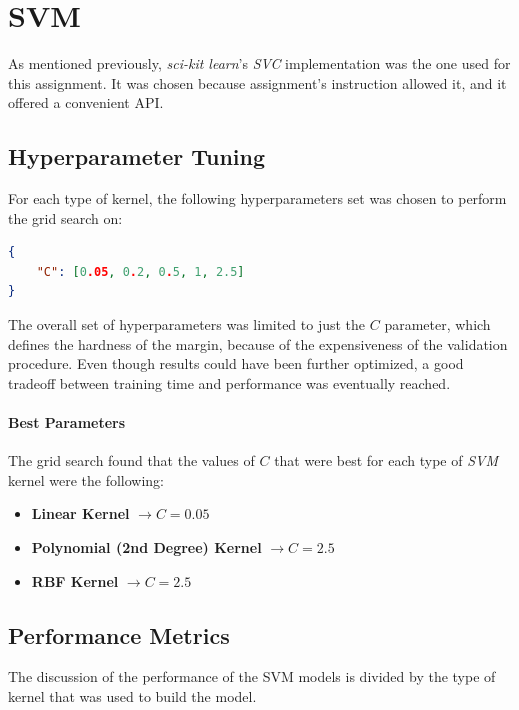 \newpage
\section{SVM}

As mentioned previously, \textit{sci-kit learn}'s \textit{SVC} implementation was the one used for this assignment. It was chosen because assignment's instruction allowed it, and it offered a convenient API.

\subsection{Hyperparameter Tuning}

For each type of kernel, the following hyperparameters set was chosen to perform the grid search on:

\begin{lstlisting}[language=json]
{
    "C": [0.05, 0.2, 0.5, 1, 2.5]
}
\end{lstlisting}

The overall set of hyperparameters was limited to just the $C$ parameter, which defines the hardness of the margin, because of the expensiveness of the validation procedure.
Even though results could have been further optimized, a good tradeoff between training time and performance was eventually reached.

\paragraph{Best Parameters} The grid search found that the values of $C$ that were best for each type of \textit{SVM} kernel were the following:

\begin{itemize}
    \item \textbf{Linear Kernel} $\rightarrow C = 0.05$ 

    \item \textbf{Polynomial (2nd Degree) Kernel} $\rightarrow C = 2.5$ 

    \item \textbf{RBF Kernel} $\rightarrow C = 2.5$ 
\end{itemize}

\subsection{Performance Metrics}

The discussion of the performance of the SVM models is divided by the type of kernel that was used to build the model.


